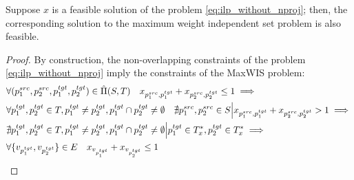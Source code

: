 \begin{lemma} \label{lemma:ilp_f_implies_maxis}
  Suppose \( x \) is a feasible solution of the problem \eqref{eq:ilp_without_nproj};
  then, the corresponding solution to the maximum weight independent set problem is also feasible.
\end{lemma}
\begin{proof}
  By construction, the non-overlapping constraints of the problem
  \eqref{eq:ilp_without_nproj} imply the constraints of the MaxWIS problem:
  \begin{align*}
    & \forall (p_1^{src}, p_2^{src}, p_1^{tgt}, p_2^{tgt}) \in \hat{\Pi}(S, T) \quad
    x_{p_1^{src}, p_1^{tgt}} + x_{p_2^{src}, p_2^{tgt}} \leq 1 \implies                                                     \\
    & \forall p_1^{tgt}, p_2^{tgt} \in T, p_1^{tgt} \neq p_2^{tgt}, p_1^{tgt} \cap p_2^{tgt} \neq \emptyset
    \quad \nexists p_1^{src}, p_2^{src} \in S \Big|
    x_{p_1^{src}, p_1^{tgt}} + x_{p_2^{src}, p_2^{tgt}} > 1 \implies                                                     \\
    & \nexists p_1^{tgt}, p_2^{tgt} \in T, p_1^{tgt} \neq p_2^{tgt}, p_1^{tgt} \cap p_2^{tgt} \neq \emptyset \Big|
    p_1^{tgt} \in T^*_x, p_2^{tgt} \in T^*_x \implies                                                                    \\
    & \forall \{ v_{p_1^{tgt}}, v_{p_2^{tgt}} \} \in E \quad x_{v_{p_1^{tgt}}} + x_{v_{p_2^{tgt}}}\leq 1
  \end{align*}
\end{proof}


